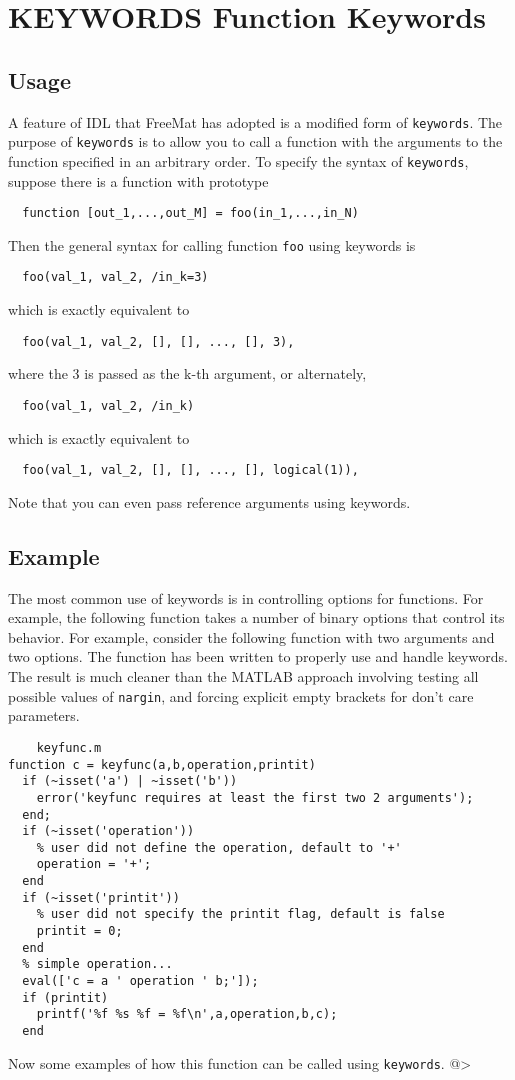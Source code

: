 \section{KEYWORDS Function Keywords}

\subsection{Usage}

A feature of IDL that FreeMat has adopted is a modified
form of \verb|keywords|.  The purpose of \verb|keywords| is to 
allow you to call a function with the arguments to the
function specified in an arbitrary order.  To specify
the syntax of \verb|keywords|, suppose there is a function 
with prototype
\begin{verbatim}
  function [out_1,...,out_M] = foo(in_1,...,in_N)
\end{verbatim}
Then the general syntax for calling function \verb|foo| using keywords
is
\begin{verbatim}
  foo(val_1, val_2, /in_k=3)
\end{verbatim}
which is exactly equivalent to
\begin{verbatim}
  foo(val_1, val_2, [], [], ..., [], 3),
\end{verbatim}
where the 3 is passed as the k-th argument, or alternately,
\begin{verbatim}
  foo(val_1, val_2, /in_k)
\end{verbatim}
which is exactly equivalent to
\begin{verbatim}
  foo(val_1, val_2, [], [], ..., [], logical(1)),
\end{verbatim}
Note that you can even pass reference arguments using keywords.
\subsection{Example}

The most common use of keywords is in controlling options for
functions.  For example, the following function takes a number
of binary options that control its behavior.  For example,
consider the following function with two arguments and two
options.  The function has been written to properly use and
handle keywords.  The result is much cleaner than the MATLAB
approach involving testing all possible values of \verb|nargin|,
and forcing explicit empty brackets for don't care parameters.
\begin{verbatim}
    keyfunc.m
function c = keyfunc(a,b,operation,printit)
  if (~isset('a') | ~isset('b')) 
    error('keyfunc requires at least the first two 2 arguments'); 
  end;
  if (~isset('operation'))
    % user did not define the operation, default to '+'
    operation = '+';
  end
  if (~isset('printit'))
    % user did not specify the printit flag, default is false
    printit = 0;
  end
  % simple operation...
  eval(['c = a ' operation ' b;']);
  if (printit) 
    printf('%f %s %f = %f\n',a,operation,b,c);
  end
\end{verbatim}
Now some examples of how this function can be called using
\verb|keywords|.
@>
